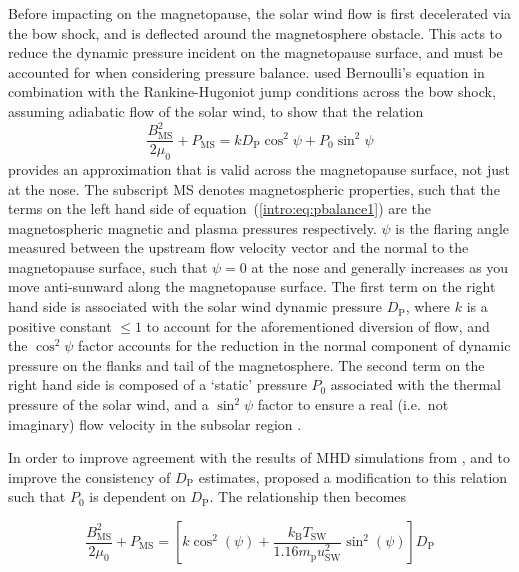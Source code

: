 Before impacting on the magnetopause, the solar wind flow is first decelerated via the bow shock, and is deflected around the magnetosphere obstacle. This acts to reduce the dynamic pressure incident on the magnetopause surface, and must be accounted for when considering pressure balance. \citet{petrinec1997} used Bernoulli's equation in combination with the Rankine-Hugoniot jump conditions across the bow shock, assuming adiabatic flow of the solar wind, to show that the relation
\begin{equation}\label{intro:eq:pbalance1}
\frac{B_{\mathrm{MS}}^2}{2\mu_0} + P_{\mathrm{MS}} = kD_\mathrm{P}\cos^2\psi + P_0\sin^2\psi
\end{equation}
provides an approximation that is valid across the magnetopause surface, not just at the nose. The subscript {\scshape{MS}} denotes magnetospheric properties, such that the terms on the left hand side of equation~(\ref{intro:eq:pbalance1}) are the magnetospheric magnetic and plasma pressures respectively. $\psi$ is the flaring angle measured between the upstream flow velocity vector and the normal to the magnetopause surface, such that $\psi=0$ at the nose and generally increases as you move anti-sunward along the magnetopause surface. The first term on the right hand side is associated with the solar wind dynamic pressure $D_\mathrm{P}$, where $k$ is a positive constant $\leq1$ to account for the aforementioned diversion of flow, and the $\cos^2\psi$ factor accounts for the reduction in the normal component of dynamic pressure on the flanks and tail of the magnetosphere. The second term on the right hand side is composed of a `static' pressure $P_0$ associated with the thermal pressure of the solar wind, and a $\sin^2\psi$ factor to ensure a real (i.e.\ not imaginary) flow velocity in the subsolar region \citep[see][]{petrinec1997}.

In order to improve agreement with the results of MHD simulations from \citet{hansen2005}, and to improve the consistency of $D_\mathrm{P}$ estimates, \citet{kanani2010} proposed a modification to this relation such that $P_0$ is dependent on $D_\mathrm{P}$. The relationship then becomes

\begin{equation}\label{intro:eq:pbalance2}
\frac{B_\mathrm{MS}^2}{2\mu_0} + P_\mathrm{MS} = \left[k\cos^2(\psi) + \frac{k_\mathrm{B}T_\mathrm{SW}}{1.16m_\mathrm{p}u_\mathrm{SW}^2}\sin^2(\psi)\right] D_\mathrm{P}
\end{equation}

